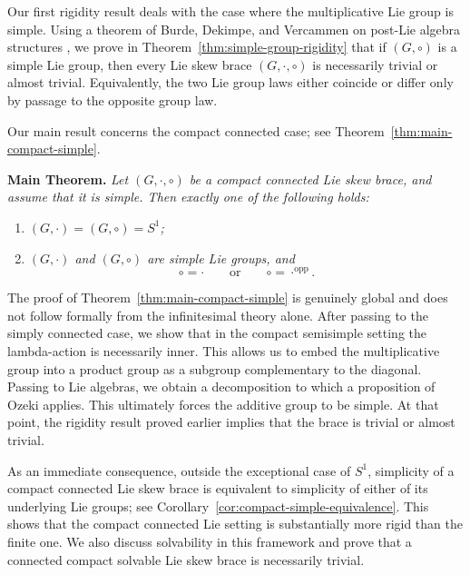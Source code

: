 \documentclass[reqno]{amsart}
\begin{document}
Our first rigidity result deals with the case where the multiplicative
Lie group is simple. Using a theorem of Burde, Dekimpe, and Vercammen
on post-Lie algebra structures \cite{Burde2012affineaction}, we prove
in Theorem~\ref{thm:simple-group-rigidity} that if \((G,\circ)\) is a
simple Lie group, then every Lie skew brace \((G,\cdot,\circ)\) is
necessarily trivial or almost trivial. Equivalently, the two Lie group
laws either coincide or differ only by passage to the opposite group
law.

Our main result concerns the compact connected case; see
Theorem~\ref{thm:main-compact-simple}.

\medskip

\noindent\textbf{Main Theorem.}
\emph{Let \((G,\cdot,\circ)\) be a compact connected Lie skew brace,
and assume that it is simple. Then exactly one of the following holds:}
\begin{enumerate}[label=\textup{(\alph*)}]
    \item \emph{\((G,\cdot)=(G,\circ)=S^1\);}
    \item \emph{\((G,\cdot)\) and \((G,\circ)\) are simple Lie groups,
    and}
    \[
    \circ=\cdot
    \qquad\text{or}\qquad
    \circ=\cdot^{\mathrm{opp}}.
    \]
\end{enumerate}

\medskip

The proof of Theorem~\ref{thm:main-compact-simple} is genuinely
global and does not follow formally from the infinitesimal theory
alone. After passing to the simply connected case, we show that in the
compact semisimple setting the lambda-action is necessarily inner.
This allows us to embed the multiplicative group into a product group
as a subgroup complementary to the diagonal. Passing to Lie algebras,
we obtain a decomposition to which a proposition of Ozeki
\cite{Ozeki1977} applies. This ultimately forces the additive group to
be simple. At that point, the rigidity result proved earlier implies
that the brace is trivial or almost trivial.

As an immediate consequence, outside the exceptional case of \(S^1\),
simplicity of a compact connected Lie skew brace is equivalent to
simplicity of either  of its underlying Lie groups; see
Corollary~\ref{cor:compact-simple-equivalence}. This shows that the
compact connected Lie setting is substantially more rigid than the
finite one. We also discuss solvability in this framework and prove
that a connected compact solvable Lie skew brace is necessarily
trivial.
\end{document}
